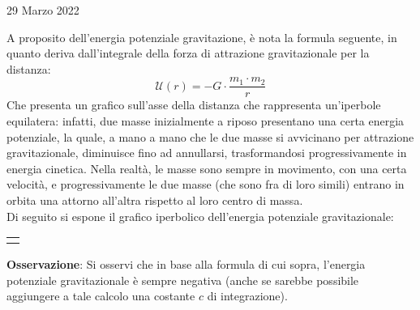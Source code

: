 \documentclass[a4paper]{extarticle}
\begin{document}
\newpage
\noindent
\begin{center}
  29 Marzo 2022
\end{center}
A proposito dell'energia potenziale gravitazione, è nota la formula seguente, in quanto deriva dall'integrale della forza di attrazione gravitazionale per la distanza:
\[\boxed{\mathcal{U}(r) = - G \cdot \frac{m_1 \cdot m_2}{r}}\]
Che presenta un grafico sull'asse della distanza che rappresenta un'iperbole equilatera: infatti, due masse inizialmente a riposo presentano una certa energia potenziale, la quale, a mano a mano che le due masse si avvicinano per attrazione gravitazionale, diminuisce fino ad annullarsi, trasformandosi progressivamente in energia cinetica. Nella realtà, le masse sono sempre in movimento, con una certa velocità, e progressivamente le due masse (che sono fra di loro simili) entrano in orbita una attorno all'altra rispetto al loro centro di massa.\\
Di seguito si espone il grafico iperbolico dell'energia potenziale gravitazionale:

\vspace{2em}
\noindent
{}
\begin{tabularx}{\textwidth}{P}
  {
      \centering
  }
\end{tabularx}

\vspace{1em}
\noindent
\textbf{Osservazione}: Si osservi che in base alla formula di cui sopra, l'energia potenziale gravitazionale è sempre negativa (anche se sarebbe possibile aggiungere a tale calcolo una costante $c$ di integrazione).
\end{document}
